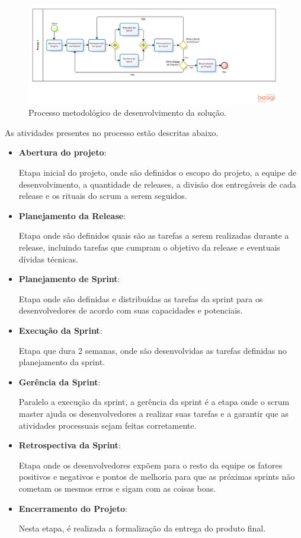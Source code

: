 	\begin{figure}[H]
		\centering
		\includegraphics[scale=0.55]{figuras/processo_scrum.png}
		\caption{Processo metodológico de desenvolvimento da solução.}
		\label{img:processo_scrum}
	\end{figure}


	As atividades presentes no processo estão descritas abaixo.

	\begin{itemize}
		\item \textbf{Abertura do projeto}:

			Etapa inicial do projeto, onde são definidos o escopo do projeto, a equipe de desenvolvimento, a quantidade de releases, a divisão dos entregáveis de cada release e os rituais do scrum a serem seguidos.

		\item \textbf{Planejamento da Release}:

			Etapa onde são definidos quais são as tarefas a serem realizadas durante a release, incluindo tarefas que cumpram o objetivo da release e eventuais dívidas técnicas.

		\item \textbf{Planejamento de Sprint}:

			Etapa onde são definidas e distribuídas as tarefas da sprint para os desenvolvedores de acordo com suas capacidades e potenciais.

		\item \textbf{Execução da Sprint}:

			Etapa que dura 2 semanas, onde são desenvolvidas as tarefas definidas no planejamento da sprint.

		\item \textbf{Gerência da Sprint}:

			Paralelo a execução da sprint, a gerência da sprint é a etapa onde o scrum master ajuda os desenvolvedores a realizar suas tarefas e a garantir que as atividades processuais sejam feitas corretamente.

		\item \textbf{Retrospectiva da Sprint}:

			Etapa onde os desenvolvedores expõem para o resto da equipe os fatores positivos e negativos e pontos de melhoria para que as próximas sprints não cometam os mesmos erros e sigam com as coisas boas.

		\item \textbf{Encerramento do Projeto}:

			Nesta etapa, é realizada a formalização da entrega do produto final.

	\end{itemize}


